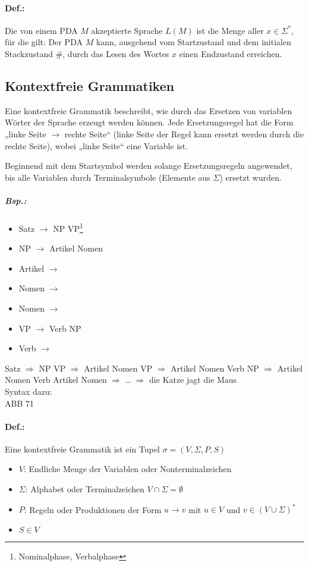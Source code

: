 \paragraph{Def.:} Die von einem PDA $M$ akzeptierte Sprache $L(M)$ ist die Menge aller $x \in \Sigma^*$, für die gilt: Der PDA $M$ kann, ausgehend vom Startzustand und dem initialen Stackzustand $\#$, durch das Lesen des Wortes $x$ einen Endzustand erreichen.

\subsection{Kontextfreie Grammatiken}
Eine kontextfreie Grammatik beschreibt, wie durch das Ersetzen von variablen Wörter der Sprache erzeugt werden können. Jede Ersetzungsregel hat die Form „linke Seite $\to$ rechte Seite“ (linke Seite der Regel kann ersetzt werden durch die rechte Seite), wobei „linke Seite“ eine Variable ist. 

Beginnend mit dem Startsymbol werden solange Ersetzungsregeln angewendet, bis alle Variablen durch Terminalsymbole (Elemente aus $\Sigma$) ersetzt wurden.

\subparagraph{Bsp.:}
\begin{itemize}
\item Satz $\to$ NP VP\footnote{Nominalphase, Verbalphase}
\item NP $\to$ Artikel Nomen
\item Artikel $\to$ 
\item Nomen $\to$ 
\item Nomen $\to$ 
\item VP $\to$ Verb NP
\item Verb $\to$ 
\end{itemize}
Satz $\Rightarrow$ NP VP $\Rightarrow$ Artikel Nomen VP $\Rightarrow$ Artikel Nomen Verb NP $\Rightarrow$ Artikel Nomen Verb Artikel Nomen $\Rightarrow$ … $\Rightarrow$ die Katze jagt die Maus\\
Syntax dazu:\\
ABB 71

\paragraph{Def.:} Eine kontextfreie Grammatik ist ein Tupel $\sigma = (V, \Sigma, P, S)$
\begin{itemize}
\item $V$: Endliche Menge der Variablen oder Nonterminalzeichen
\item $\Sigma$: Alphabet oder Terminalzeichen $V\cap \Sigma = \emptyset$
\item $P$: Regeln oder Produktionen der Form $u \to v$ mit $u \in V$ und $v \in (V\cup \Sigma)^*$
\item $S \in V$
\end{itemize}

